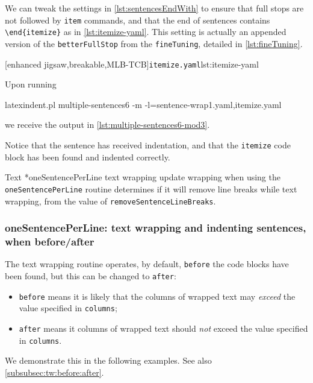  \begin{example}
 We can tweak the settings in \vref{lst:sentencesEndWith} to ensure that full stops are
 not followed by \texttt{item} commands, and that the end of sentences contains
 \lstinline!\end{itemize}! as in \cref{lst:itemize-yaml}. This setting is actually an
 appended version of the \texttt{betterFullStop} from the \texttt{fineTuning}, detailed
 in \vref{lst:fineTuning}.    

 [enhanced jigsaw,breakable,MLB-TCB]{\texttt{itemize.yaml}}{lst:itemize-yaml}

 Upon running  

 \begin{commandshell}
latexindent.pl multiple-sentences6 -m -l=sentence-wrap1.yaml,itemize.yaml
\end{commandshell}

 we receive the output in \cref{lst:multiple-sentences6-mod3}.


 Notice that the sentence has received indentation, and that the \texttt{itemize} code
 block has been found and indented correctly.
 \end{example}

 Text *{oneSentencePerLine text wrapping update} wrapping when using
 the \texttt{oneSentencePerLine} routine determines if it will remove line breaks while
 text wrapping, from the value of \texttt{removeSentenceLineBreaks}.

\subsubsection{oneSentencePerLine: text wrapping and indenting sentences, when before/after}\label{subsubsec:ospl:before:after}
 The text wrapping routine operates, by default, \texttt{before} the
  code blocks have been found, but
 this can be changed to \texttt{after}:
 \begin{itemize}
  \item \texttt{before} means it is likely that the columns of wrapped text may \emph{exceed} the
        value specified in \texttt{columns};
  \item \texttt{after} means it columns of wrapped text should \emph{not} exceed the value
        specified in \texttt{columns}.
 \end{itemize}
 We demonstrate this in the following examples. See also
 \cref{subsubsec:tw:before:after}.

